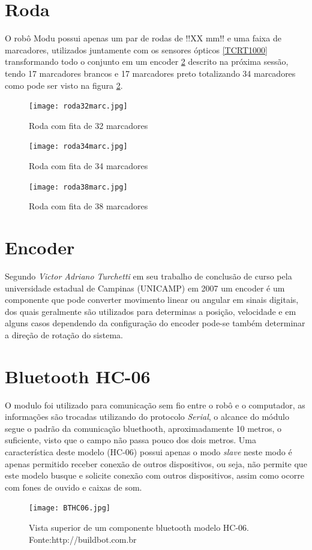 \documentclass[a4paper,12pt,portuguese]{ufms-cpcx}
\begin{document}
\section{Roda}\label{roda}
O robô Modu possui apenas um par de rodas de !!XX mm!! e uma faixa de marcadores, utilizados juntamente com os sensores ópticos \ref{TCRT1000} transformando todo o conjunto em um encoder \ref{encoder} descrito na próxima sessão, tendo 17 marcadores brancos e 17 marcadores preto totalizando 34 marcadores como pode ser visto na figura \ref{fig:roda34marc}.
\begin{figure}[H]
	\centering
	\texttt{[image: roda32marc.jpg]}
	\caption{Roda com fita de 32 marcadores}
	\label{fig:roda32marc}
\end{figure}
\begin{figure}[H]
	\centering
	\texttt{[image: roda34marc.jpg]}
	\caption{Roda com fita de 34 marcadores}
	\label{fig:roda34marc}
\end{figure}
\begin{figure}[H]
	\centering
	\texttt{[image: roda38marc.jpg]}
	\caption{Roda com fita de 38 marcadores}
	\label{fig:roda38marc}
\end{figure}

\section{Encoder}\label{encoder}
Segundo \textit{Victor Adriano Turchetti} em seu trabalho de conclusão de curso pela universidade estadual de Campinas (UNICAMP) em 2007 um encoder é um componente que pode converter movimento linear ou angular em sinais digitais, dos quais geralmente são utilizados para determinas a posição, velocidade e em alguns casos dependendo da configuração do encoder pode-se também determinar a direção de rotação do sistema. 

\section{Bluetooth HC-06}\label{bthc06}
O modulo foi utilizado para comunicação sem fio entre o robô e o computador, as informações são trocadas utilizando do protocolo \textit{Serial}, o alcance do módulo segue o padrão da comunicação bluethooth, aproximadamente 10 metros, o suficiente, visto que o campo não passa pouco dos dois metros. Uma característica deste modelo (HC-06) possui apenas o modo \textit{slave} neste modo é apenas permitido receber conexão de outros dispositivos, ou seja, não permite que este modelo busque e solicite conexão com outros dispositivos, assim como ocorre com fones de ouvido e caixas de som.
\begin{figure}[H]	
	\centering
	\texttt{[image: BTHC06.jpg]}
	\caption{Vista superior de um componente bluetooth modelo HC-06. Fonte:http://buildbot.com.br}
\end{figure}
\end{document}
